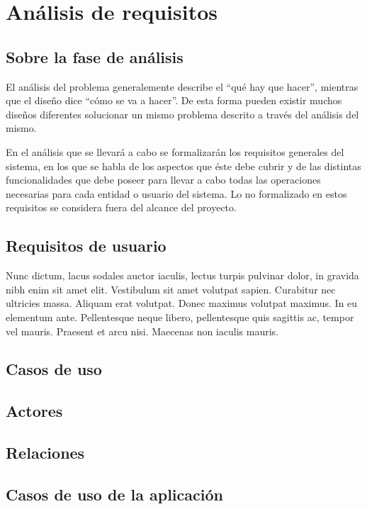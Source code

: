 \chapter{Análisis de requisitos}
\label{cap3}

\section{Sobre la fase de análisis}

El análisis del problema generalemente describe el ``qué hay que hacer'',
mientras que el diseño dice ``cómo se va a hacer''. De esta forma pueden
existir muchos diseños diferentes solucionar un mismo problema descrito a
través del análisis del mismo.

En el análisis que se llevará a cabo se formalizarán los requisitos generales
del sistema, en los que se habla de los aspectos que éste debe cubrir y de las
distintas funcionalidades que debe poseer para llevar a cabo todas las
operaciones necesarias para cada entidad o usuario del sistema. Lo no
formalizado en estos requisitos se considera fuera del alcance del proyecto.

\section{Requisitos de usuario}

Nunc dictum, lacus sodales auctor iaculis, lectus turpis pulvinar dolor, in
gravida nibh enim sit amet elit. Vestibulum sit amet volutpat sapien. Curabitur
nec ultricies massa. Aliquam erat volutpat. Donec maximus volutpat maximus. In
eu elementum ante. Pellentesque neque libero, pellentesque quis sagittis ac,
tempor vel mauris. Praesent et arcu nisi. Maecenas non iaculis mauris.

\section{Casos de uso}

\section{Actores}

\section{Relaciones}

\section{Casos de uso de la aplicación}

